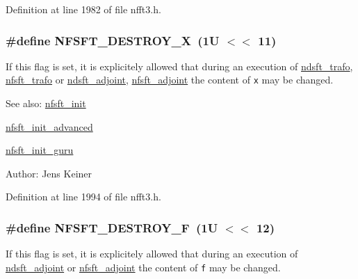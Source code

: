Definition at line 1982 of file nfft3.h.\hypertarget{group__nfsft_g6f22df0b292db920d795b3e3569181f2}{
\subsubsection{\setlength{\rightskip}{0pt plus 5cm}\#define NFSFT\_\-DESTROY\_\-X~(1U $<$$<$ 11)}}
\label{group__nfsft_g6f22df0b292db920d795b3e3569181f2}


If this flag is set, it is explicitely allowed that during an execution of \hyperlink{group__nfsft_gc1bcdf551a0bf1b4a5890b87e583caf8}{ndsft\_\-trafo}, \hyperlink{group__nfsft_g5796fc68c432d46dfcab7abd8c56ee22}{nfsft\_\-trafo} or \hyperlink{group__nfsft_g88c7be3ead1c726a1d5b8b903952c527}{ndsft\_\-adjoint}, \hyperlink{group__nfsft_g813bb48d404c7286310733c99a81a169}{nfsft\_\-adjoint} the content of {\tt x} may be changed. 

\begin{Desc}
\item[See also:]\hyperlink{group__nfsft_g65cda3f4a3edc5eb39c697cf34b1f0b9}{nfsft\_\-init} 

\hyperlink{group__nfsft_ge7dca3e41afdb39e8c518af414878c18}{nfsft\_\-init\_\-advanced} 

\hyperlink{group__nfsft_g60466ed37643b6b7b7c1638056604d2b}{nfsft\_\-init\_\-guru} \end{Desc}
\begin{Desc}
\item[Author:]Jens Keiner \end{Desc}


Definition at line 1994 of file nfft3.h.\hypertarget{group__nfsft_g2b32e2eabd33bf0886f6df45365d04c0}{
\subsubsection{\setlength{\rightskip}{0pt plus 5cm}\#define NFSFT\_\-DESTROY\_\-F~(1U $<$$<$ 12)}}
\label{group__nfsft_g2b32e2eabd33bf0886f6df45365d04c0}


If this flag is set, it is explicitely allowed that during an execution of \hyperlink{group__nfsft_g88c7be3ead1c726a1d5b8b903952c527}{ndsft\_\-adjoint} or \hyperlink{group__nfsft_g813bb48d404c7286310733c99a81a169}{nfsft\_\-adjoint} the content of {\tt f} may be changed. 

